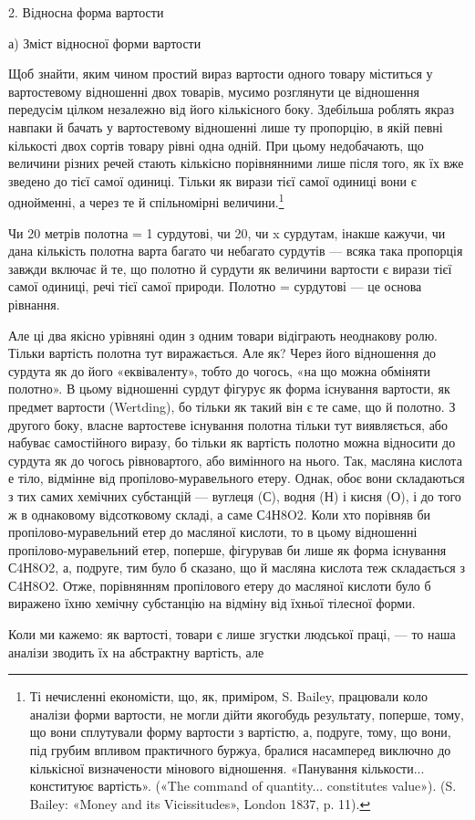 2. Відносна форма вартости

а) Зміст відносної форми вартости

Щоб знайти, яким чином простий вираз вартости одного товару
міститься у вартостевому відношенні двох товарів, мусимо
розглянути це відношення передусім цілком незалежно від його
кількісного боку. Здебільша роблять якраз навпаки й бачать у
вартостевому відношенні лише ту пропорцію, в якій певні кількості
двох сортів товару рівні одна одній. При цьому недобачають,
що величини різних речей стають кількісно порівнянними
лише після того, як їх вже зведено до тієї самої одиниці. Тільки
як вирази тієї самої одиниці вони є однойменні, а через те й спільномірні
величини.\footnote{
Ті нечисленні економісти, що, як, приміром, S. Bailey, працювали
коло аналізи форми вартости, не могли дійти якогобудь результату,
поперше, тому, що вони сплутували форму вартости з вартістю, а, подруге,
тому, що вони, під грубим впливом практичного буржуа, бралися насамперед
виключно до кількісної визначености мінового відношення. «Панування
кількости... конституює вартість». («The command of quantity...
constitutes value»). (S. Bailey: «Money and its Vicissitudes», London
1837, p. 11).
}

Чи 20 метрів полотна = 1 сурдутові, чи 20, чи x сурдутам,
інакше кажучи, чи дана кількість полотна варта багато чи небагато
сурдутів — всяка така пропорція завжди включає й те, що
полотно й сурдути як величини вартости є вирази тієї самої одиниці,
речі тієї самої природи. Полотно = сурдутові — це основа
рівнання.

Але ці два якісно урівняні один з одним товари відіграють
неоднакову ролю. Тільки вартість полотна тут виражається. Але
як? Через його відношення до сурдута як до його «еквіваленту»,
тобто до чогось, «на що можна обміняти полотно». В цьому відношенні
сурдут фігурує як форма існування вартости, як предмет
вартости (Wertding), бо тільки як такий він є те саме, що й полотно.
З другого боку, власне вартостеве існування полотна
тільки тут виявляється, або набуває самостійного виразу, бо
тільки як вартість полотно можна відносити до сурдута як до
чогось рівновартого, або вимінного на нього. Так, масляна кислота
е тіло, відмінне від пропілово-муравельного етеру. Однак, обоє
вони складаються з тих самих хемічних субстанцій — вуглеця
(С), водня (Н) і кисня (О), і до того ж в однаковому відсотковому
складі, а саме С4Н8O2. Коли хто порівняв би пропілово-муравельний
етер до масляної кислоти, то в цьому відношенні пропілово-муравельний
етер, поперше, фігурував би лише як форма
існування С4Н8O2, а, подруге, тим було б сказано, що й масляна
кислота теж складається з С4Н8O2. Отже, порівнянням пропілового
етеру до масляної кислоти було б виражено їхню хемічну
субстанцію на відміну від їхньої тілесної форми.

Коли ми кажемо: як вартості, товари є лише згустки людської
праці, — то наша аналізи зводить їх на абстрактну вартість, але